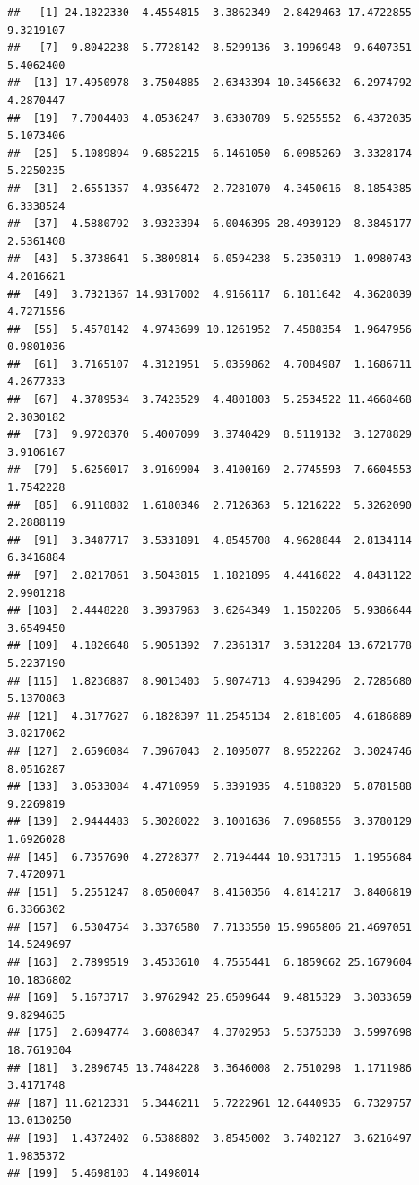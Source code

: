 \documentclass[
]{article}
\begin{document}
\begin{verbatim}
##   [1] 24.1822330  4.4554815  3.3862349  2.8429463 17.4722855  9.3219107
##   [7]  9.8042238  5.7728142  8.5299136  3.1996948  9.6407351  5.4062400
##  [13] 17.4950978  3.7504885  2.6343394 10.3456632  6.2974792  4.2870447
##  [19]  7.7004403  4.0536247  3.6330789  5.9255552  6.4372035  5.1073406
##  [25]  5.1089894  9.6852215  6.1461050  6.0985269  3.3328174  5.2250235
##  [31]  2.6551357  4.9356472  2.7281070  4.3450616  8.1854385  6.3338524
##  [37]  4.5880792  3.9323394  6.0046395 28.4939129  8.3845177  2.5361408
##  [43]  5.3738641  5.3809814  6.0594238  5.2350319  1.0980743  4.2016621
##  [49]  3.7321367 14.9317002  4.9166117  6.1811642  4.3628039  4.7271556
##  [55]  5.4578142  4.9743699 10.1261952  7.4588354  1.9647956  0.9801036
##  [61]  3.7165107  4.3121951  5.0359862  4.7084987  1.1686711  4.2677333
##  [67]  4.3789534  3.7423529  4.4801803  5.2534522 11.4668468  2.3030182
##  [73]  9.9720370  5.4007099  3.3740429  8.5119132  3.1278829  3.9106167
##  [79]  5.6256017  3.9169904  3.4100169  2.7745593  7.6604553  1.7542228
##  [85]  6.9110882  1.6180346  2.7126363  5.1216222  5.3262090  2.2888119
##  [91]  3.3487717  3.5331891  4.8545708  4.9628844  2.8134114  6.3416884
##  [97]  2.8217861  3.5043815  1.1821895  4.4416822  4.8431122  2.9901218
## [103]  2.4448228  3.3937963  3.6264349  1.1502206  5.9386644  3.6549450
## [109]  4.1826648  5.9051392  7.2361317  3.5312284 13.6721778  5.2237190
## [115]  1.8236887  8.9013403  5.9074713  4.9394296  2.7285680  5.1370863
## [121]  4.3177627  6.1828397 11.2545134  2.8181005  4.6186889  3.8217062
## [127]  2.6596084  7.3967043  2.1095077  8.9522262  3.3024746  8.0516287
## [133]  3.0533084  4.4710959  5.3391935  4.5188320  5.8781588  9.2269819
## [139]  2.9444483  5.3028022  3.1001636  7.0968556  3.3780129  1.6926028
## [145]  6.7357690  4.2728377  2.7194444 10.9317315  1.1955684  7.4720971
## [151]  5.2551247  8.0500047  8.4150356  4.8141217  3.8406819  6.3366302
## [157]  6.5304754  3.3376580  7.7133550 15.9965806 21.4697051 14.5249697
## [163]  2.7899519  3.4533610  4.7555441  6.1859662 25.1679604 10.1836802
## [169]  5.1673717  3.9762942 25.6509644  9.4815329  3.3033659  9.8294635
## [175]  2.6094774  3.6080347  4.3702953  5.5375330  3.5997698 18.7619304
## [181]  3.2896745 13.7484228  3.3646008  2.7510298  1.1711986  3.4171748
## [187] 11.6212331  5.3446211  5.7222961 12.6440935  6.7329757 13.0130250
## [193]  1.4372402  6.5388802  3.8545002  3.7402127  3.6216497  1.9835372
## [199]  5.4698103  4.1498014
\end{verbatim}
\end{document}
